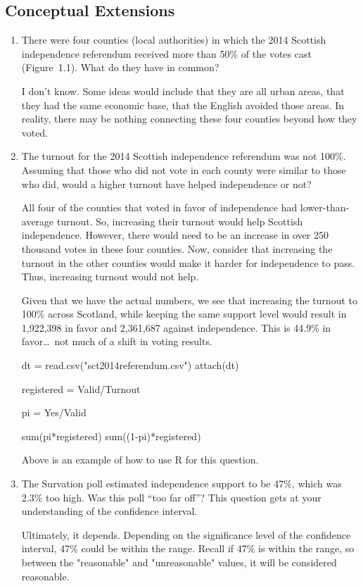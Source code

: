 \subsection*{Conceptual Extensions}
\begin{enumerate}

 \item There were four counties (local authorities) in which the 2014 Scottish independence referendum received more than 50\% of the votes cast (Figure~1.1). What do they have in common?
\begin{solution}
I don't know. Some ideas would include that they are all urban areas, that they had the same economic base, that the English avoided those areas. In reality, there may be nothing connecting these four counties beyond how they voted. 
\end{solution}
%


 \item The turnout for the 2014 Scottish independence referendum was not 100\%. Assuming that those who did not vote in each county were similar to those who did, would a higher turnout have helped independence or not?
\begin{solution}
All four of the counties that voted in favor of independence had lower-than-average turnout. So, increasing their turnout would help Scottish independence. However, there would need to be an increase in over 250 thousand votes in these four counties. Now, consider that increasing the turnout in the other counties would make it harder for independence to pass. Thus, increasing turnout would not help.

Given that we have the actual numbers, we see that increasing the turnout to 100\% across Scotland, while keeping the same support level would result in 1,922,398 in favor and 2,361,687 against independence. This is 44.9\% in favor\ldots\ not much of a shift in voting results.
\begin{codein}
dt = read.csv("sct2014referendum.csv")
attach(dt)

registered = Valid/Turnout

pi = Yes/Valid

sum(pi*registered)
sum((1-pi)*registered)
\end{codein}
Above is an example of how to use R for this question. 
\end{solution}
%


 \item The Survation poll estimated independence support to be 47\%, which was 2.3\% too high. Was this poll ``too far off''? This question gets at your understanding of the confidence interval.
\begin{solution}
Ultimately, it depends. Depending on the significance level of the confidence interval, 47\% could be within the range. Recall if 47\% is within the range, so between the "reasonable" and "unreasonable" values, it will be considered reasonable. 
\end{solution}
%


\end{enumerate}
